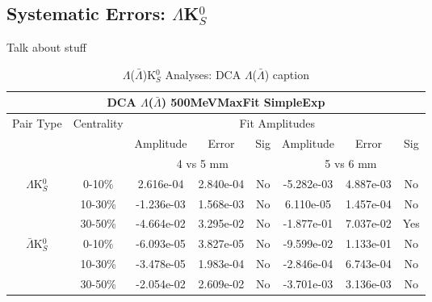 \documentclass[../AnalysisNoteJBuxton.tex]{subfiles}
\begin{document}
\subsection{Systematic Errors: \texorpdfstring{$\Lambda$K$^{0}_{S}$}{TEXT}}
\label{SysErrsLamK0}

Talk about stuff

\begin{table}
 \centering
 \begin{tabular}{|c|c|c|c|c||c|c|c|}
  \multicolumn{8}{c}{DCA $\Lambda$($\bar{\Lambda}$) 500MeVMaxFit SimpleExp} \\
  \hline
  \multirow{3}{*}{Pair Type} & \multirow{3}{*}{Centrality} & \multicolumn{6}{c|}{Fit Amplitudes} \\
  \cline{3-8}
   & & Amplitude & Error & Sig & Amplitude & Error & Sig \\
  \cline{3-8}
   & & \multicolumn{3}{c||}{4 vs 5 mm} & \multicolumn{3}{c|}{5 vs 6 mm} \\
  \hline  
  \multirow{3}{*}{$\Lambda$K$^{0}_{S}$}  
   &  0-10\% & 2.616e-04 & 2.840e-04 & No & -5.282e-03 & 4.887e-03 & No \\
   & 10-30\% & -1.236e-03 & 1.568e-03 & No & 6.110e-05 & 1.457e-04 & No \\
   & 30-50\% & -4.664e-02 & 3.295e-02 & No & -1.877e-01 & 7.037e-02 & Yes \\
  \hline  
  \multirow{3}{*}{$\bar{\Lambda}$K$^{0}_{S}$}  
   &  0-10\% & -6.093e-05 & 3.827e-05 & No & -9.599e-02 & 1.133e-01 & No \\
   & 10-30\% & -3.478e-05 & 1.983e-04 & No & -2.846e-04 & 6.743e-04 & No \\
   & 30-50\% & -2.054e-02 & 2.609e-02 & No & -3.701e-03 & 3.136e-03 & No \\
  \hline
 \end{tabular}
 \caption{$\Lambda$($\bar{\Lambda}$)K$^{0}_{S}$ Analyses: DCA $\Lambda$($\bar{\Lambda}$) caption}
 \label{tab:LamDcaLamK0_500MeVMaxFit_SimpleExp}
\end{table}

\end{document}
